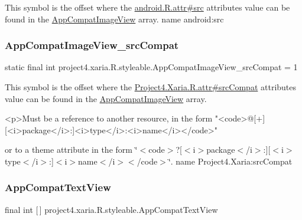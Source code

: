 This symbol is the offset where the \hyperlink{}{android.\+R.\+attr\#src} attribute\textquotesingle{}s value can be found in the \hyperlink{classproject4_1_1xaria_1_1R_1_1styleable_a54846c2740bf432b91663abbcab31165}{App\+Compat\+Image\+View} array.  name android\+:src \mbox{\label{classproject4_1_1xaria_1_1R_1_1styleable_a604f27dd13923b0ff25a57688e6688eb}} 
\subsubsection{\texorpdfstring{App\+Compat\+Image\+View\+\_\+src\+Compat}{AppCompatImageView\_srcCompat}}
{\footnotesize\ttfamily static final int project4.\+xaria.\+R.\+styleable.\+App\+Compat\+Image\+View\+\_\+src\+Compat = 1\hspace{0.3cm}{\ttfamily [static]}}

This symbol is the offset where the \hyperlink{}{Project4.\+Xaria.\+R.\+attr\#src\+Compat} attribute\textquotesingle{}s value can be found in the \hyperlink{classproject4_1_1xaria_1_1R_1_1styleable_a54846c2740bf432b91663abbcab31165}{App\+Compat\+Image\+View} array.

\begin{DoxyVerb}      <p>Must be a reference to another resource, in the form "<code>@[+][<i>package</i>:]<i>type</i>:<i>name</i></code>"
\end{DoxyVerb}
 or to a theme attribute in the form \char`\"{}$<$code$>$?\mbox{[}$<$i$>$package$<$/i$>$\+:\mbox{]}\mbox{[}$<$i$>$type$<$/i$>$\+:\mbox{]}$<$i$>$name$<$/i$>$$<$/code$>$\char`\"{}.  name Project4.\+Xaria\+:src\+Compat \mbox{\label{classproject4_1_1xaria_1_1R_1_1styleable_aabfaf2a95fcd2f9933956d90112a5a8a}} 
\subsubsection{\texorpdfstring{App\+Compat\+Text\+View}{AppCompatTextView}}
{\footnotesize\ttfamily final int \mbox{[}$\,$\mbox{]} project4.\+xaria.\+R.\+styleable.\+App\+Compat\+Text\+View\hspace{0.3cm}{\ttfamily [static]}}

